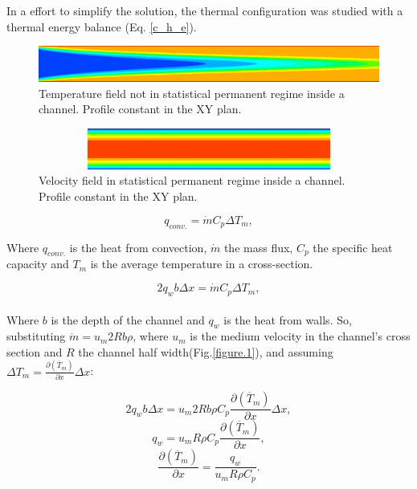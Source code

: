 \documentclass[10pt]{article} %
\begin{document}
In a effort to simplify the solution, the thermal configuration was studied with a thermal energy balance (Eq. \ref{c_h_e}).
\begin{figure}[h!]
	\centering
	\includegraphics[angle=0, scale=0.4]{fotos_formatacao_final/temperatura}
	\caption{Temperature field not in statistical permanent regime inside a channel. Profile constant in the XY plan.}
	\label{figure.2}
\end{figure}
\begin{figure}[h!]
	\centering
	\includegraphics[angle=0, height=1.35cm , width=12.3cm]{fotos_formatacao_final/velocidade}
	\caption{Velocity field in statistical permanent regime inside a channel. Profile constant in the XY plan.}
	\label{figure.3}
\end{figure}


\begin{equation}\label{c_h_e}
q_{conv.} = \dot{m} C_p \Delta T_m,
\end{equation}

Where $q_{conv.}$ is the heat from convection, $\dot{m}$ the mass flux, $C_p$ the specific heat capacity and $T_m$ is the average temperature in a cross-section. 

\begin{equation}
2q_w b \Delta x = \dot{m} C_p \Delta T_m,
\end{equation}\\

Where $b$ is the depth of the channel and $q_w$ is the heat from walls. So, substituting $ \dot{m} = u_m 2R b \rho $, where $u_m$ is the medium velocity in the channel's cross section and $R$ the channel half width(Fig.\ref{figure.1}), and assuming $ \Delta T_m = \frac{\partial{\left(\overline{T}_m\right)}}{\partial{x}} \Delta x $:

\begin{equation}
2q_w b \Delta x = u_m 2R b \rho  C_p \frac{\partial{\left(\overline{T}_m\right)}}{\partial{x}} \Delta x,
\end{equation}     
\begin{equation}
q_w = u_m R \rho  C_p \frac{\partial{\left(\overline{T}_m\right)}}{\partial{x}} ,
\end{equation} 
\begin{equation}\label{c_h_ee}
\frac{\partial{\left(\overline{T}_m\right)}}{\partial{x}} = \frac{q_w}{u_m  R \rho  C_p } .
\end{equation} 
\end{document}
